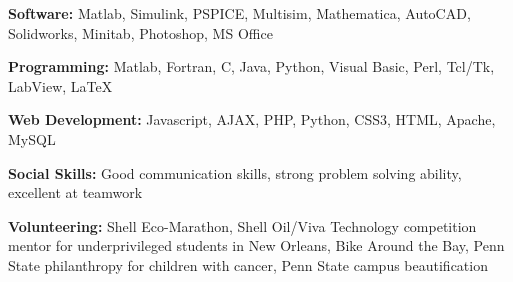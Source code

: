 \documentclass[9pt]{extarticle}
\begin{document}
\begin{description}[itemsep=-3pt,leftmargin=30.5pt,itemindent=-2em]
\item[] \textbf{Software:} Matlab, Simulink, PSPICE, Multisim, Mathematica,  AutoCAD, Solidworks, Minitab, Photoshop, MS Office
\item[] \textbf{Programming:} Matlab, Fortran, C, Java, Python, Visual Basic, Perl, Tcl/Tk, LabView, LaTeX
\item[] \textbf{Web Development:} Javascript, AJAX, PHP, Python, CSS3, HTML, Apache, MySQL
\item[] \textbf{Social Skills:} Good communication skills, strong problem solving ability, excellent at teamwork
\item[] \textbf{Volunteering:} Shell Eco-Marathon, Shell Oil/Viva Technology competition mentor for underprivileged students in New Orleans, Bike Around the Bay, Penn State philanthropy for children with cancer, Penn State campus beautification
\end{description}
\end{document}
